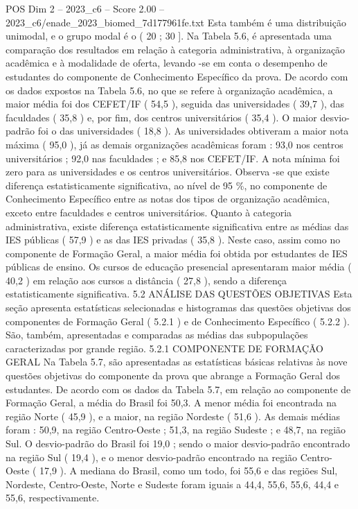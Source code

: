 \begin{textsample}{POS Dim 2 – 2023\_c6 – Score 2.00 – 2023\_c6/enade\_2023\_biomed\_7d177961fe.txt}
Esta também é uma distribuição unimodal, e o grupo modal é o ( 20 ; 30 ].
Na Tabela 5.6, é apresentada uma comparação dos resultados em relação à categoria administrativa, à organização acadêmica e à modalidade de oferta, levando -se em conta o desempenho de estudantes do componente de Conhecimento Específico da prova.
De acordo com os dados expostos na Tabela 5.6, no que se refere à organização acadêmica, a maior média foi dos CEFET/IF ( 54,5 ), seguida das universidades ( 39,7 ), das faculdades ( 35,8 ) e, por fim, dos centros universitários ( 35,4 ).
O maior desvio-padrão foi o das universidades ( 18,8 ).
As universidades obtiveram a maior nota máxima ( 95,0 ), já as demais organizações acadêmicas foram : 93,0 nos centros universitários ; 92,0 nas faculdades ; e 85,8 nos CEFET/IF.
A nota mínima foi zero para as universidades e os centros universitários.
Observa -se que existe diferença estatisticamente significativa, ao nível de 95 \%, no componente de Conhecimento Específico entre as notas dos tipos de organização acadêmica, exceto entre faculdades e centros universitários.
Quanto à categoria administrativa, existe diferença estatisticamente significativa entre as médias das IES públicas ( 57,9 ) e as das IES privadas ( 35,8 ).
Neste caso, assim como no componente de Formação Geral, a maior média foi obtida por estudantes de IES públicas de ensino.
Os cursos de educação presencial apresentaram maior média ( 40,2 ) em relação aos cursos a distância ( 27,8 ), sendo a diferença estatisticamente significativa. 5.2 ANÁLISE DAS QUESTÕES OBJETIVAS Esta seção apresenta estatísticas selecionadas e histogramas das questões objetivas dos componentes de Formação Geral ( 5.2.1 ) e de Conhecimento Específico ( 5.2.2 ).
São, também, apresentadas e comparadas as médias das subpopulações caracterizadas por grande região. 5.2.1 COMPONENTE DE FORMAÇÃO GERAL Na Tabela 5.7, são apresentadas as estatísticas básicas relativas às nove questões objetivas do componente da prova que abrange a Formação Geral dos estudantes.
De acordo com os dados da Tabela 5.7, em relação ao componente de Formação Geral, a média do Brasil foi 50,3.
A menor média foi encontrada na região Norte ( 45,9 ), e a maior, na região Nordeste ( 51,6 ).
As demais médias foram : 50,9, na região Centro-Oeste ; 51,3, na região Sudeste ; e 48,7, na região Sul.
O desvio-padrão do Brasil foi 19,0 ; sendo o maior desvio-padrão encontrado na região Sul ( 19,4 ), e o menor desvio-padrão encontrado na região Centro-Oeste ( 17,9 ).
A mediana do Brasil, como um todo, foi 55,6 e das regiões Sul, Nordeste, Centro-Oeste, Norte e Sudeste foram iguais a 44,4, 55,6, 55,6, 44,4 e 55,6, respectivamente.

\end{textsample}
